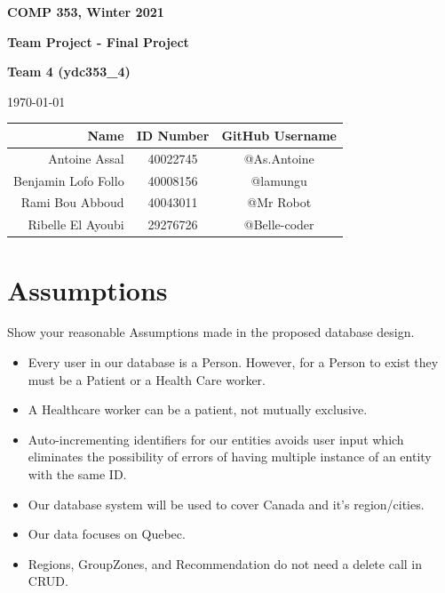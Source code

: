 \documentclass{article}
\date{April 2021}
\begin{document}
               

                \vspace*{3in}
                \centerline{\bf\Large COMP 353, Winter 2021}
                \centerline{\bf\Large Team Project - Final Project}

                \vspace*{0.5in}
                \centerline{\bf\Large Team 4 (ydc353\_4)}

                \vspace*{0.5in}
                \centerline{\today}

                \vspace*{0.5in}
                \begin{table}[htbp]
                    \begin{center}
                        \begin{tabular}{|r | c| c|}
                            \hline
                            Name & ID Number & GitHub Username \\
                            \hline\
                            Antoine Assal & 40022745 & @As.Antoine  \\
                            \hline
                            Benjamin Lofo Follo & 40008156 & @lamungu \\ 
                            \hline
                            Rami Bou Abboud & 40043011 & @Mr Robot \\
                            \hline
                            Ribelle El Ayoubi & 29276726  & @Belle-coder\\
                            \hline
                        \end{tabular}
                    \end{center}
                \end{table}
                \newpage
\tableofcontents
\listoffigures

\newpage
\listoftables
\newpage


\section{Assumptions}
Show your reasonable Assumptions made in the proposed database design.
\begin{itemize}
    \item Every user in our database is a Person. However, for a Person to exist they must be a Patient or a Health Care worker.
    \item A Healthcare worker can be a patient, not mutually exclusive.
    \item Auto-incrementing identifiers for our entities avoids user input which eliminates the possibility of errors of having multiple instance of an entity with the same ID.
    \item Our database system will be used to cover Canada and it's region/cities.
    \item Our data focuses on Quebec.
    \item Regions, GroupZones, and Recommendation do not need a delete call in CRUD.
\end{itemize}
\end{document}

